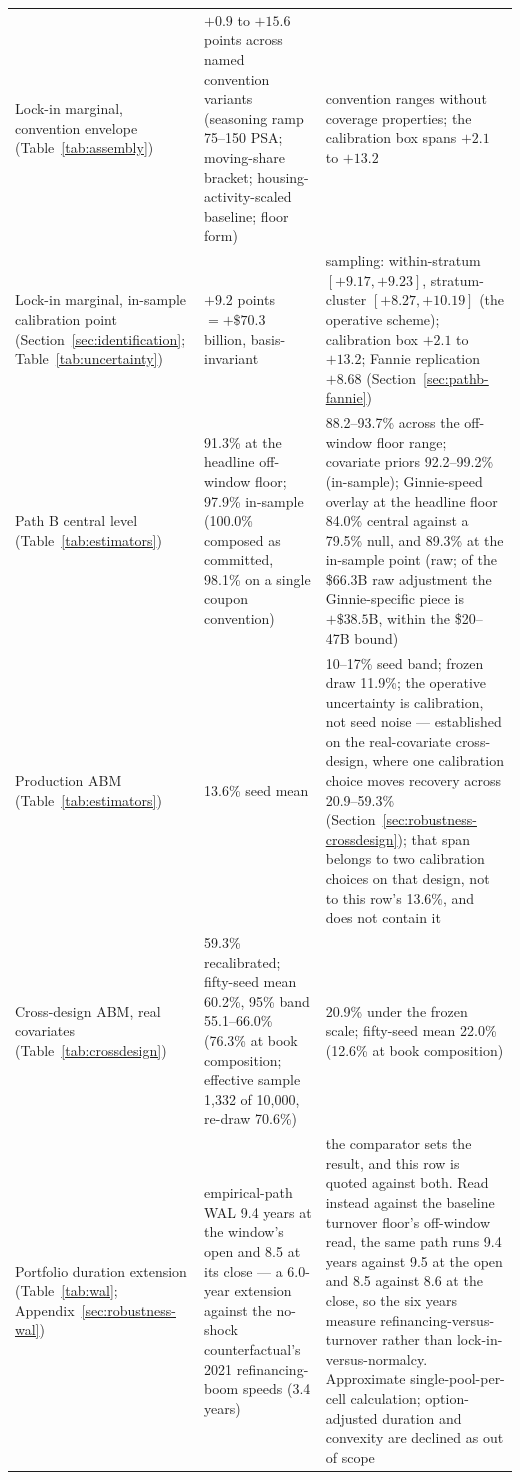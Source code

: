 {\begin{longtable}{@{}p{4.6cm}p{4.6cm}p{5.3cm}@{}}
Lock-in marginal, convention envelope (Table~\ref{tab:assembly}) & $+0.9$ to $+15.6$ points across named convention variants (seasoning ramp 75--150 PSA; moving-share bracket; housing-activity-scaled baseline; floor form) & convention ranges without coverage properties; the calibration box spans $+2.1$ to $+13.2$ \\
\addlinespace
Lock-in marginal, in-sample calibration point (Section~\ref{sec:identification}; Table~\ref{tab:uncertainty}) & $+9.2$ points $= +\$70.3$ billion, basis-invariant & sampling: within-stratum $[+9.17, +9.23]$, stratum-cluster $[+8.27, +10.19]$ (the operative scheme); calibration box $+2.1$ to $+13.2$; Fannie replication $+8.68$ (Section~\ref{sec:pathb-fannie}) \\
Path B central level (Table~\ref{tab:estimators}) & 91.3\% at the headline off-window floor; 97.9\% in-sample (100.0\% composed as committed, 98.1\% on a single coupon convention) & 88.2--93.7\% across the off-window floor range; covariate priors 92.2--99.2\% (in-sample); Ginnie-speed overlay at the headline floor 84.0\% central against a 79.5\% null, and 89.3\% at the in-sample point (raw; of the \$66.3B raw adjustment the Ginnie-specific piece is $+\$38.5$B, within the \$20--47B bound) \\
Production ABM (Table~\ref{tab:estimators}) & 13.6\% seed mean & 10--17\% seed band; frozen draw 11.9\%; the operative uncertainty is calibration, not seed noise --- established on the real-covariate cross-design, where one calibration choice moves recovery across 20.9--59.3\% (Section~\ref{sec:robustness-crossdesign}); that span belongs to two calibration choices on that design, not to this row's 13.6\%, and does not contain it \\
Cross-design ABM, real covariates (Table~\ref{tab:crossdesign}) & 59.3\% recalibrated; fifty-seed mean 60.2\%, 95\% band 55.1--66.0\% (76.3\% at book composition; effective sample 1{,}332 of 10{,}000, re-draw 70.6\%) & 20.9\% under the frozen scale; fifty-seed mean 22.0\% (12.6\% at book composition) \\
\addlinespace
Portfolio duration extension (Table~\ref{tab:wal}; Appendix~\ref{sec:robustness-wal}) & empirical-path WAL 9.4 years at the window's open and 8.5 at its close --- a 6.0-year extension against the no-shock counterfactual's 2021 refinancing-boom speeds (3.4 years) & the comparator sets the result, and this row is quoted against both. Read instead against the baseline turnover floor's off-window read, the same path runs 9.4 years against 9.5 at the open and 8.5 against 8.6 at the close, so the six years measure refinancing-versus-turnover rather than lock-in-versus-normalcy. Approximate single-pool-per-cell calculation; option-adjusted duration and convexity are declined as out of scope \\
\bottomrule
\end{longtable}
}


